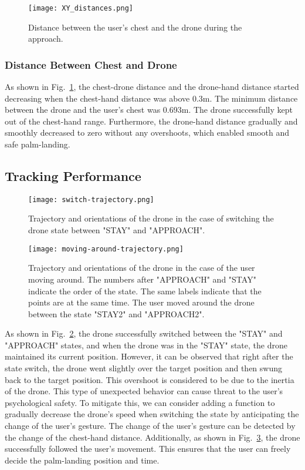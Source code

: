 \begin{figure}
  \centering
  \texttt{[image: XY\_distances.png]}
  \caption{Distance between the user's chest and the drone during the approach.}
  \label{fig:simple_hand_landing_xy_distances}
\end{figure}
\subsubsection{Distance Between Chest and Drone}
As shown in Fig.~\ref{fig:simple_hand_landing_xy_distances}, the chest-drone distance and the drone-hand distance started decreasing 
when the chest-hand distance was above 0.3m.
The minimum distance between the drone and the user's chest was 0.693m.
The drone successfully kept out of the chest-hand range.
Furthermore, the drone-hand distance gradually and smoothly decreased to zero without any overshoots,
which enabled smooth and safe palm-landing.

\subsection{Tracking Performance}
\begin{figure}
  \centering
  \texttt{[image: switch-trajectory.png]}
  \caption{Trajectory and orientations of the drone in the case of switching the drone state between "STAY" and "APPROACH".}
  \label{fig:switch}
\end{figure}
\begin{figure}
  \centering
  \texttt{[image: moving-around-trajectory.png]}
  \caption{Trajectory and orientations of the drone in the case of the user moving around. 
  The numbers after "APPROACH" and "STAY" indicate the order of the state. 
  The same labels indicate that the points are at the same time. The user moved around the drone between the state "STAY2" and "APPROACH2".}
  \label{fig:moving}
\end{figure}
As shown in Fig.~\ref{fig:switch}, the drone successfully switched between the "STAY" and "APPROACH" states,
and when the drone was in the "STAY" state, the drone maintained its current position.
However, it can be observed that right after the state switch, the drone went slightly over the target position and then swung back to the target position.
This overshoot is considered to be due to the inertia of the drone.
This type of unexpected behavior can cause threat to the user's psychological safety.
To mitigate this, we can consider adding a function to gradually decrease the drone's speed when switching the state by anticipating the change of the user's gesture.
The change of the user's gesture can be detected by the change of the chest-hand distance.
Additionally, as shown in Fig.~\ref{fig:moving}, the drone successfully followed the user's movement.
This ensures that the user can freely decide the palm-landing position and time.

